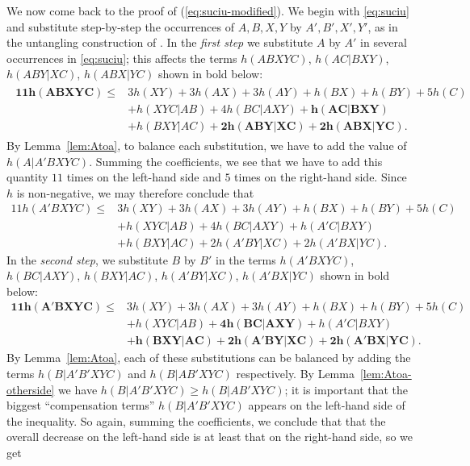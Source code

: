 \documentclass[a4paper,cleveref]{lipics-v2021}
\begin{document}
We now come back to the proof of (\ref{eq:suciu-modified}). We begin with \eqref{eq:suciu} and substitute step-by-step the occurrences of $A,B,X,Y$ by $A',B',X',Y'$, as in the untangling construction of . 
In the \emph{first step} we substitute $A$ by $A'$ in several occurrences in \eqref{eq:suciu}; 
this affects the terms  $h(ABXYC)$, $h(AC|BXY)$, $h(ABY|XC)$, $h(ABX|YC)$ shown in bold below:
%
\begin{align}
	\begin{split}
	\bm{ 11 h(ABXYC) } \le &3 h(XY) + 3h(AX) + 3h(AY) +h(BX) + h(BY) + 5h(C) \\
	& + h(XYC|AB) + 4h(BC|AXY) + \bm{h(AC|BXY)} \\&+ h(BXY|AC)+ \bm{ 2h(ABY|XC) } +  \bm{ 2h(ABX|YC) }.
	\end{split}\nonumber
\end{align}
%
By Lemma~\ref{lem:Atoa}, to balance each  substitution, we have to add the value of $h(A|A'BXYC)$.
Summing the coefficients,  we see that we have to add this quantity $11$ times on the left-hand side and $5$ times on the right-hand side.
Since $h$ is non-negative, we may therefore conclude that 
\begin{align}
	11 h(A'BXYC) \le &3 h(XY) + 3h(AX) + 3h(AY) +h(BX) + h(BY) + 5h(C) \nonumber\\
	& + h(XYC|AB) + 4h(BC|AXY) + h(A'C|BXY) \nonumber \\&+ h(BXY|AC)+ 2h(A'BY|XC) + 2h(A'BX|YC).\label{eq:suciu2}
\end{align}
In the \emph{second step}, we substitute $B$ by $B'$ in the terms $h(A'BXYC)$, $h(BC|AXY)$, $h(BXY|AC)$, $h(A'BY|XC)$, $h(A'BX|YC)$
shown in bold below:
%
\begin{align}
	\bm{11 h(A'BXYC)} \le &3 h(XY) + 3h(AX) + 3h(AY) +h(BX) + h(BY) + 5h(C) \nonumber\\
	& + h(XYC|AB) + \bm{4h(BC|AXY)} + h(A'C|BXY) \nonumber \\&+\bm{ h(BXY|AC)} 
	+ \bm{2h(A'BY|XC)} +  \bm{ 2h(A'BX|YC) }.\nonumber
\end{align}
%
By Lemma~\ref{lem:Atoa},  each of these substitutions can be balanced by adding the terms  $h(B|A'B'XYC)$ and $h(B|AB'XYC)$ respectively. 
By Lemma~\ref{lem:Atoa-otherside} we have $h(B|A'B'XYC)\ge h(B|AB'XYC)$; it is important that  the biggest  ``compensation terms'' $h(B|A'B'XYC)$ 
appears on the left-hand side of the inequality.
So again, summing the coefficients, we conclude that that the overall decrease on the left-hand side is at least that on the right-hand side, so we get
\end{document}
